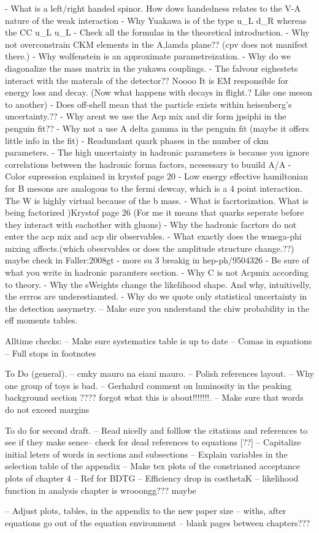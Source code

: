 - What is a left/right handed spinor. How dows handedness relates to the V-A nature of the weak interaction
- Why Yuakawa is of the type u_L d_R whereas the CC u_L u_L
- Check all the formulas in the theoretical introduction.
- Why not overconstrain CKM elements in the A,lamda plane?? (cpv does not manifest there.)
- Why wolfenstein is an approximate parametreization.
- Why do we diagonalize the mass matrix in the yukawa couplings.
- The falvour eighestets interact with the materals of the detector?? Noooo
  It is EM responsible for energy loss and decay. (Now what happens with decays in flight.? Like one meson to another)
- Does off-shell mean that the particle exists within heisenberg's uncertainty.??
- Why arent we use the Acp mix and dir form jpsiphi in the penguin fit??
- Why not a use A delta gamma in the penguin fit (maybe it offers little info in the fit)
- Readundant quark phases in the number of ckm parameters.
- The high uncertainty in hadronic parameters is because you ignore correlations between the hadronic forma factors, ncesessary to buuild A/A
- Color supression  explained in krystof page 20
- Low energy effective hamiltonian for B mesons are analogous to the fermi dewcay, which is a 4 point interaction. The W is highly virtual because of the b mass.
- What is facrtorization. What is being factorized )Krystof page 26 (For me it means that quarks seperate before they interact with eachother with gluons)
- Why the hadronic facrtors do not enter the acp mix and acp dir observables.
- What exactly does the wmega-phi mixing affects.(which obesrvables or does the amplitude structure change.??)  maybe check in  {Faller:2008gt}
- more su 3 breakig in hep-ph/9504326
- Be sure of what you write in hadronic paramters section.
- Why C is not Acpmix according to theory.
- Why the sWeights change the likelihood shape. And why, intuitivelly, the errros are underestiamted.
- Why do we quote only statistical uncertainty in the detection assymetry.
-- Make sure you understand the chiw probability in the eff moments tables.

Alltime checks:
-- Make sure systematics table is up to date
-- Comas in equations
-- Full stops in footnotes

To Do (general).
-- cmky mauro na eiani mauro.
-- Polish references layout.
-- Why one group of toys is bad.
-- Gerhahrd comment on luminosity in the peaking background section ???? forgot what this is about!!!!!!!.
-- Make sure that words do not exceed margins

To do for second draft.
-- Read nicelly and folllow the citations and references to see if they make sence-- check for dead references to equations [??]
-- Capitalize initial leters of words in sections and subsections
-- Explain variables in the selection table of the appendix
-- Make tex plots of the constrianed acceptance plots of chapter 4
-- Ref for BDTG
-- Efficiency drop in costhetaK
-- likelihood function in analysis chapter is wrooongg??? maybe

-- Adjust plots, tables, in the appendix to the new paper size
-- withs, after equations go out of the equation environment
-- blank pages between chapters???
